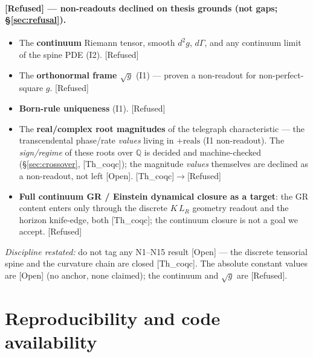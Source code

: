 \documentclass[10pt,twocolumn]{article}
\theoremstyle{definition}
\newcommand{\Thq}{\textsf{[Th\_coqc]}}
\newcommand{\Open}{\textsf{[Open]}}
\newcommand{\Refu}{\textsf{[Refused]}}
\newcommand{\LR}{L_{R}}
\begin{document}
\paragraph{\Refu{} --- non-readouts declined on thesis grounds (not gaps; \S\ref{sec:refusal}).}
\begin{itemize}\itemsep2pt
\item The \textbf{continuum} Riemann tensor, smooth $d^2 g$, $d\Gamma$, and any continuum
  limit of the spine PDE (I2). \Refu{}
\item The \textbf{orthonormal frame $\sqrt{g}$} (I1) --- proven a non-readout for
  non-perfect-square $g$. \Refu{}
\item \textbf{Born-rule uniqueness} (I1). \Refu{}
\item The \textbf{real/complex root magnitudes} of the telegraph characteristic --- the
  transcendental phase/rate \emph{values} living in $+\mathrm{reals}$ (I1 non-readout). The
  \emph{sign/regime} of these roots over $\mathbb{Q}$ is decided and machine-checked
  (\S\ref{sec:crossover}, \Thq{}); the magnitude \emph{values} themselves are declined as a
  non-readout, not left \Open{}. \Thq{}$\to$\Refu{}
\item \textbf{Full continuum GR / Einstein dynamical closure as a target}: the GR content
  enters only through the discrete $K\,\LR$ geometry readout and the horizon knife-edge, both
  \Thq{}; the continuum closure is not a goal we accept. \Refu{}
\end{itemize}

\noindent\emph{Discipline restated:} do not tag any N1--N15 result \Open{} --- the discrete
tensorial spine and the curvature chain are closed \Thq{}. The absolute constant values are
\Open{} (no anchor, none claimed); the continuum and $\sqrt{g}$ are \Refu{}.

\section{Reproducibility and code availability}\label{sec:repro}
\end{document}
